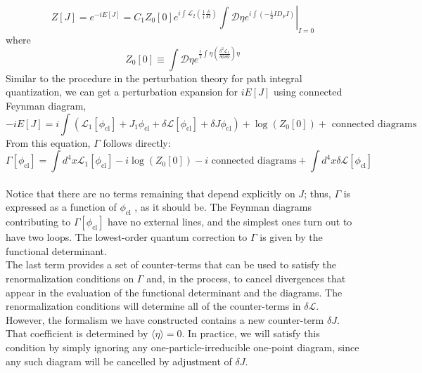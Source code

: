 \documentclass[cyan]{elegantnote}
\begin{document}
\[Z[J] = e^{-iE[J]} =C_1 Z_0[0] e^{i\int \mathcal{L}_2(\frac{1}{i} \frac{\delta}{\delta I})} \left. \int \mathcal{D}\eta e^{i\int \left(-\frac{1}{2} I D_F I \right)} \right|_{I=0}\]
where
\[Z_0[0] \equiv \int \mathcal{D}\eta e^{ \frac{i}{2}\int \eta \left( \frac{\delta^2 \mathcal{L}_1}{\delta \phi \delta \phi}\right) \eta }\]
Similar to the procedure in the perturbation theory for path integral quantization, we can get a perturbation expansion for $iE[J]$ using connected Feynman diagram,
\[-iE[J] = i \int ( \mathcal{L}_1 [\phi_{\mathrm{cl}}] + J_1\phi_{\mathrm{cl}} + \delta \mathcal{L}[\phi_{\mathrm{cl}}] + \delta J \phi_{\mathrm{cl}} ) + \log(Z_0[0]) + \mbox{ connected diagrams }\]
From this equation, $\Gamma$ follows directly:
\[\Gamma[\phi_{\mathrm{cl}}] = \int d^4x \mathcal{L}_1[\phi_{\mathrm{cl}}] -i\log(Z_0[0]) -i \mbox{ connected diagrams} + \int d^4x \delta\mathcal{L}[\phi_{\mathrm{cl}}]\]
\\
Notice that there are no terms remaining that depend explicitly on $J$; thus, $\Gamma$ is expressed as a function of $\phi_{\mathrm{cl}}$ , as it should be. The Feynman diagrams contributing to $\Gamma[\phi_{\mathrm{cl}}]$ have no external lines, and the simplest ones turn out to have two loops. The lowest-order quantum correction to $\Gamma$ is given by the
functional determinant.
\\
The last term provides a set of counter-terms that can be used
to satisfy the renormalization conditions on $\Gamma$ and, in the process, to cancel divergences that appear in the evaluation of the functional determinant and the diagrams. The renormalization conditions will determine all of the counter-terms in $\delta \mathcal{L}$. However, the formalism we have constructed contains a new counter-term $\delta J$. That coefficient is determined by  $\langle \eta \rangle = 0$. In practice, we will satisfy this condition by simply ignoring any one-particle-irreducible one-point diagram, since any such diagram will be cancelled by adjustment of $\delta J$.
\end{document}
